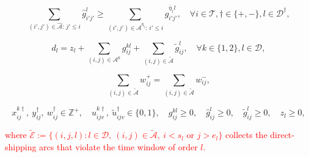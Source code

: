 \documentclass[10pt, reqno]{amsart}
\begin{document}
{\begin{equation}
\sum_{(i',j') \in \hat{\mathcal{A}} :\, j' \le i} \hat{g}_{i'j'}^l \ge \sum_{(i',j') \in \mathcal{A}^{\bar{\eta}_{\dagger}} :\, i' \le i} g_{i'j'}^{\bar{\eta}_{\dagger} l}, \quad \forall i \in \mathcal{T}, \dagger \in \{+,-\}, l \in \mathcal{D}^{\dagger},\label{m2:transfer step 2}
\end{equation}

\begin{equation}
d_l = z_l + \sum_{(i,j) \in \mathcal{A}^k} g_{ij}^{kl}+\sum_{(i,j)\in\tilde{\mathcal{A}}}\tilde{g}^l_{ij}, \quad \forall k \in \{1,2\}, l \in \mathcal{D},\label{m2:unserved}
\end{equation}

\begin{equation}
\sum_{(i,j)\in\tilde{\mathcal{A}}} w^{+}_{ij} = \sum_{(i,j)\in\tilde{\mathcal{A}}} w^{-}_{ij},\label{m2:return}
\end{equation}

\begin{equation}
x_{ij}^{k\dagger},\ y_{ij}^{\dagger},\ w_{ij}^{\dagger} \in \mathbb{Z}^+,\quad u_{ijv}^{k\dagger},\ \tilde{u}_{ijv}^{\dagger} \in \{0,1\},\quad g_{ij}^{kl} \ge 0,\quad \hat{g}_{ij}^{l} \ge 0,\quad \tilde{g}_{ij}^{l} \ge 0,\quad z_l \ge 0,\label{m2:domain}
\end{equation}
}
\textcolor{red}{where $\tilde{\mathcal{E}} := \{(i,j,l) : l \in \mathcal{D},\ (i,j) \in \tilde{\mathcal{A}},\ i < s_l \text{ or } j > e_l\}$ collects the direct-shipping arcs that violate the time window of order $l$.}
\end{document}
